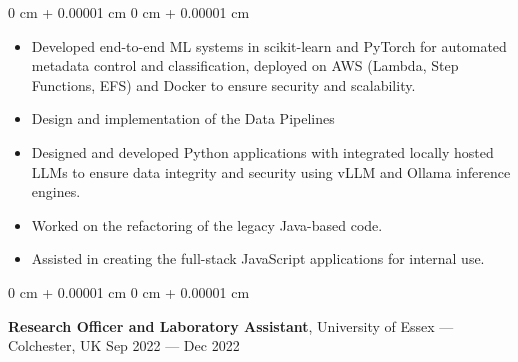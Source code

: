 \documentclass[10pt, letterpaper]{article}
\newenvironment{highlights}{
    \begin{itemize}[
        topsep=0.10 cm,
        parsep=0.10 cm,
        partopsep=0pt,
        itemsep=0pt,
        leftmargin=0 cm + 10pt
    ]
}{
    \end{itemize}
} %
\newenvironment{onecolentry}{
    \begin{adjustwidth}{
        0 cm + 0.00001 cm
    }{
        0 cm + 0.00001 cm
    }
}{
    \end{adjustwidth}
} %
\newenvironment{twocolentry}[2][]{
    \onecolentry
    \def\secondColumn{#2}
    \setcolumnwidth{\fill, 4.5 cm}
    \begin{paracol}{2}
}{
    \switchcolumn \raggedleft \secondColumn
    \end{paracol}
    \endonecolentry
} %
\begin{document}
        \vspace{0.10 cm}
        \begin{onecolentry}
            \begin{highlights}
            \item Developed end-to-end ML systems in scikit-learn and PyTorch for automated metadata control and classification, deployed on AWS (Lambda, Step Functions, EFS) and Docker to ensure security and scalability.
            \item Design and implementation of the Data Pipelines 
              \item Designed and developed Python applications with integrated locally hosted LLMs to ensure data integrity and security using vLLM and Ollama inference engines.
              \item Worked on the refactoring of the legacy Java-based code.
              \item Assisted in creating the full-stack JavaScript applications for internal use.
            \end{highlights}
        \end{onecolentry}


        \vspace{0.2 cm}

        \begin{twocolentry}{
            Sep 2022 --- Dec 2022
        }
            \textbf{Research Officer and Laboratory Assistant}, University of Essex --- Colchester, UK\end{twocolentry}
\end{document}

